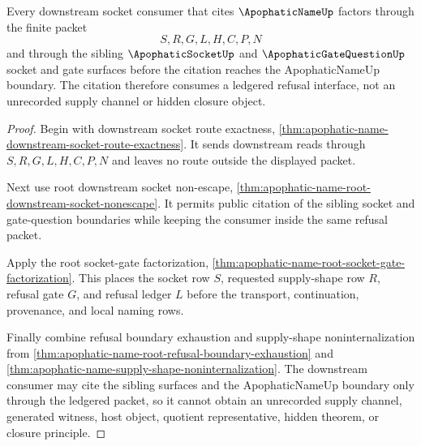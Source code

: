 \begin{theorem}
\label{thm:apophatic-name-downstream-socket-ledger-factorization}
Every downstream socket consumer that cites $\ApophaticNameUp$ factors through the finite packet
$$
S,R,G,L,H,C,P,N
$$
and through the sibling $\ApophaticSocketUp$ and $\ApophaticGateQuestionUp$ socket and gate surfaces before the citation reaches the ApophaticNameUp boundary. The citation therefore consumes a ledgered refusal interface, not an unrecorded supply channel or hidden closure object.
\end{theorem}
\begin{proof}
Begin with downstream socket route exactness, \autoref{thm:apophatic-name-downstream-socket-route-exactness}. It sends downstream reads through $S,R,G,L,H,C,P,N$ and leaves no route outside the displayed packet.

Next use root downstream socket non-escape, \autoref{thm:apophatic-name-root-downstream-socket-nonescape}. It permits public citation of the sibling socket and gate-question boundaries while keeping the consumer inside the same refusal packet.

Apply the root socket-gate factorization, \autoref{thm:apophatic-name-root-socket-gate-factorization}. This places the socket row $S$, requested supply-shape row $R$, refusal gate $G$, and refusal ledger $L$ before the transport, continuation, provenance, and local naming rows.

Finally combine refusal boundary exhaustion and supply-shape noninternalization from \autoref{thm:apophatic-name-root-refusal-boundary-exhaustion} and \autoref{thm:apophatic-name-supply-shape-noninternalization}. The downstream consumer may cite the sibling surfaces and the ApophaticNameUp boundary only through the ledgered packet, so it cannot obtain an unrecorded supply channel, generated witness, host object, quotient representative, hidden theorem, or closure principle.
\end{proof}

